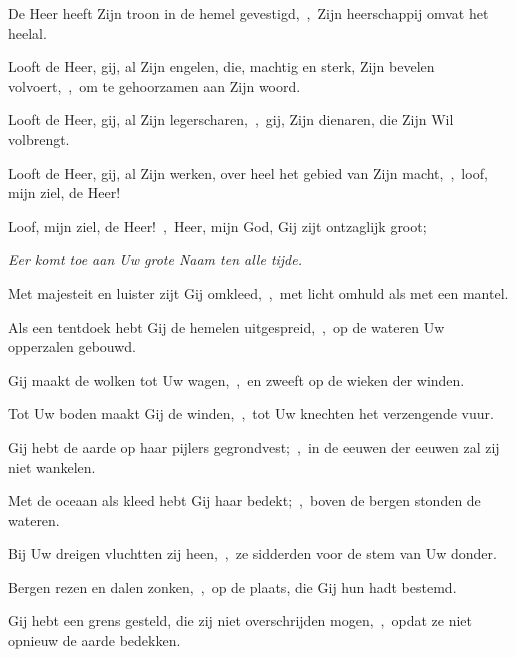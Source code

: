 \documentclass[12pt,twoside,a5paper]{article}
\begin{document}

\begin{halfparskip}
  De Heer heeft Zijn troon in de hemel gevestigd,~\sep\ Zijn heerschappij omvat het heelal.

  Looft de Heer, gij, al Zijn engelen, die, machtig en sterk, Zijn bevelen volvoert,~\sep\ om te gehoorzamen aan Zijn woord.

  Looft de Heer, gij, al Zijn legerscharen,~\sep\ gij, Zijn dienaren, die Zijn Wil volbrengt.

  Looft de Heer, gij, al Zijn werken, over heel het gebied van Zijn macht,~\sep\ loof, mijn ziel, de Heer!
\end{halfparskip}





\begin{halfparskip}
  Loof, mijn ziel, de Heer!~\sep\ Heer, mijn God, Gij zijt ontzaglijk groot;


   \emph{Eer komt toe aan Uw grote Naam ten alle tijde.}

  Met majesteit en luister zijt Gij omkleed,~\sep\ met licht omhuld als met een mantel.

  Als een tentdoek hebt Gij de hemelen uitgespreid,~\sep\ op de wateren Uw opperzalen gebouwd.

  Gij maakt de wolken tot Uw wagen,~\sep\ en zweeft op de wieken der winden.

  Tot Uw boden maakt Gij de winden,~\sep\ tot Uw knechten het verzengende vuur.

  Gij hebt de aarde op haar pijlers gegrondvest;~\sep\ in de eeuwen der eeuwen zal zij niet wankelen.

  Met de oceaan als kleed hebt Gij haar bedekt;~\sep\ boven de bergen stonden de wateren.

  Bij Uw dreigen vluchtten zij heen,~\sep\ ze sidderden voor de stem van Uw donder.

  Bergen rezen en dalen zonken,~\sep\ op de plaats, die Gij hun hadt bestemd.

  Gij hebt een grens gesteld, die zij niet overschrijden mogen,~\sep\ opdat ze niet opnieuw de aarde bedekken.
\end{halfparskip}
\end{document}
